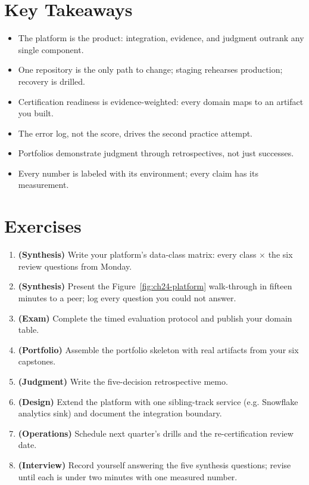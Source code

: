 \section*{Key Takeaways}
\begin{itemize}
    \item The platform is the product: integration, evidence, and judgment outrank any single component.
    \item One repository is the only path to change; staging rehearses production; recovery is drilled.
    \item Certification readiness is evidence-weighted: every domain maps to an artifact you built.
    \item The error log, not the score, drives the second practice attempt.
    \item Portfolios demonstrate judgment through retrospectives, not just successes.
    \item Every number is labeled with its environment; every claim has its measurement.
\end{itemize}

\section{Exercises}
\begin{enumerate}
    \item \textbf{(Synthesis)} Write your platform's data-class matrix: every class $\times$ the six review questions from Monday.
    \item \textbf{(Synthesis)} Present the Figure~\ref{fig:ch24-platform} walk-through in fifteen minutes to a peer; log every question you could not answer.
    \item \textbf{(Exam)} Complete the timed evaluation protocol and publish your domain table.
    \item \textbf{(Portfolio)} Assemble the portfolio skeleton with real artifacts from your six capstones.
    \item \textbf{(Judgment)} Write the five-decision retrospective memo.
    \item \textbf{(Design)} Extend the platform with one sibling-track service (e.g. Snowflake analytics sink) and document the integration boundary.
    \item \textbf{(Operations)} Schedule next quarter's drills and the re-certification review date.
    \item \textbf{(Interview)} Record yourself answering the five synthesis questions; revise until each is under two minutes with one measured number.
\end{enumerate}

